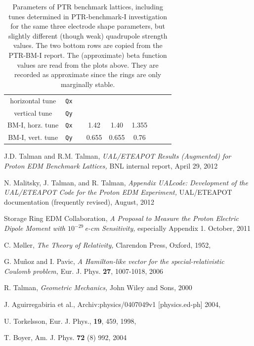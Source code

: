 \documentclass[]{article}
\begin{document}
\begin{table}[h]
\begin{tabular}{|c|c|c|c|c|c|c|c|c|}
horizontal tune  &  {\tt Qx}              &         &                                         &                            &                              \\
vertical tune     &  {\tt Qy}               &         &                                         &                           &                                  \\ \hline
BM-I, horz. tune  &  {\tt Qx}            &         &                 1.42                  &         1.40              &      1.355                  \\
BM-I, vert. tune    &  {\tt Qy}           &         &                 0.655                &         0.655            &      0.76                    \\ 
\hline
\end{tabular}
\caption{\label{tbl:benchmarkParams.1}Parameters of PTR benchmark lattices, including tunes
determined in PTR-benchmark-I investigation for the same three electrode shape parameters, but slightly 
different (though weak) quadrupole strength values.  The two bottom rows are copied from the PTR-BM-I
report.  The (approximate) beta function values are read from the plots above.  They are recorded as
approximate since the rings are only marginally stable.} 
\end{table}
%



\begin{thebibliography}{99}
J.D. Talman and R.M. Talman, \emph{ UAL/ETEAPOT Results 
(Augmented) for Proton EDM Benchmark Lattices,} BNL internal
report, April 29, 2012

N. Malitsky, J. Talman, and R. Talman, \emph{Appendix UALcode: Development of the
UAL/ETEAPOT Code for the Proton EDM Experiment,} UAL/ETEAPOT documentation
(frequently revised), August, 2012

Storage Ring EDM Collaboration, \emph{A Proposal to Measure the
Proton Electric Dipole Moment with $10^{-29}\,$e-cm Sensitivity,}
especially Appendix 1. October, 2011

C. M\o ller, \emph{The Theory of Relativity,} Clarendon Press,
Oxford, 1952, 

G. Mu\~{n}oz and I. Pavic, \emph{A Hamilton-like vector for
the special-relativistic Coulomb problem,} 
Eur. J. Phys. {\bf 27}, 1007-1018, 2006

R. Talman, \emph{Geometric Mechanics,} John Wiley and Sons, 2000

J. Aguirregabiria et al., 
Archiv:physics/0407049v1 [physics.ed-ph] 2004, 

U. Torkelsson, Eur. J. Phys., {\bf 19}, 459, 1998, 

T. Boyer, Am. J. Phys. {\bf 72} (8) 992, 2004

\end{thebibliography}
\end{document}
